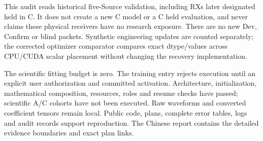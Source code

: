 \documentclass[10pt]{article}
\begin{document}
This audit reads historical five-Source validation, including RXs later designated held in C. It does not create a new C model or a C held evaluation, and never claims these physical receivers have no research exposure. There are no new Dev, Confirm or blind packets. Synthetic engineering updates are counted separately; the corrected optimizer comparator compares exact dtype/values across CPU/CUDA scalar placement without changing the recovery implementation.

The scientific fitting budget is zero. The training entry rejects execution until an explicit user authorization and committed activation. Architecture, initialization, mathematical composition, resources, roles and resume checks have passed; scientific A/C cohorts have not been executed. Raw waveforms and converted coefficient tensors remain local. Public code, plans, complete error tables, logs and audit records support reproduction. The Chinese report contains the detailed evidence boundaries and exact plan links.
\end{document}
